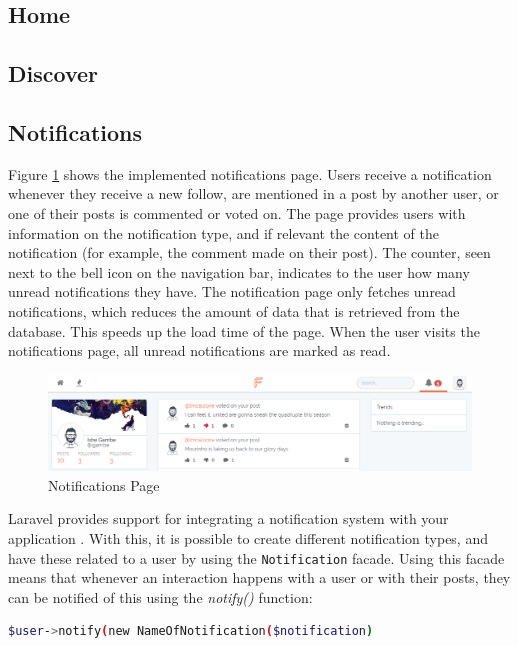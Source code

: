 \subsection{Home}
\subsection{Discover}
\subsection{Notifications}
Figure \ref{fig:NotificationsPage} shows the implemented notifications page. Users receive a notification whenever they receive a new follow, are mentioned in a post by another user, or one of their posts is commented or voted on. The page provides users with information on the notification type, and if relevant the content of the notification (for example, the comment made on their post). The counter, seen next to the bell icon on the navigation bar, indicates to the user how many unread notifications they have. The notification page only fetches unread notifications, which reduces the amount of data that is retrieved from the database. This speeds up the load time of the page. When the user visits the notifications page, all unread notifications are marked as read. 

\begin{figure}[H]
\centering
\includegraphics[width=\textwidth]{Images/Implementation/NotificationsPage}
\caption{Notifications Page}
\label{fig:NotificationsPage}
\end{figure}

Laravel provides support for integrating a notification system with your application \cite{Laravel:Notifications}. With this, it is possible to create different notification types, and have these related to a user by using the \texttt{Notification} facade. Using this facade means that whenever an interaction happens with a user or with their posts, they can be notified of this using the \textit{notify()} function:

\begin{lstlisting}[language=bash]
	$user->notify(new NameOfNotification($notification)
\end{lstlisting}

